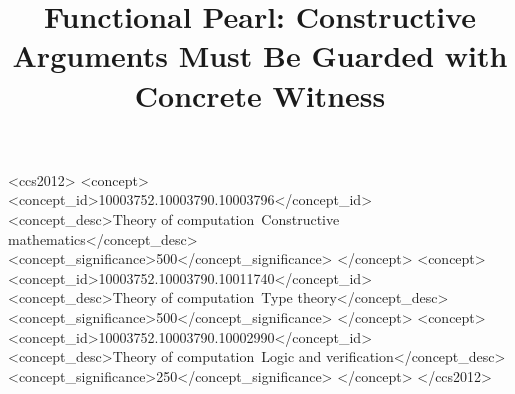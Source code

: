 \documentclass[acmsmall]{acmart}
\begin{document}
\title[Functional Pearl: Constructive Arguments]{Functional Pearl: Constructive Arguments Must Be Guarded with Concrete Witness}



\begin{abstract}
  
\end{abstract}

\begin{CCSXML}
<ccs2012>
   <concept>
       <concept_id>10003752.10003790.10003796</concept_id>
       <concept_desc>Theory of computation~Constructive mathematics</concept_desc>
       <concept_significance>500</concept_significance>
       </concept>
   <concept>
       <concept_id>10003752.10003790.10011740</concept_id>
       <concept_desc>Theory of computation~Type theory</concept_desc>
       <concept_significance>500</concept_significance>
       </concept>
   <concept>
       <concept_id>10003752.10003790.10002990</concept_id>
       <concept_desc>Theory of computation~Logic and verification</concept_desc>
       <concept_significance>250</concept_significance>
       </concept>
 </ccs2012>
\end{CCSXML}




\maketitle
\end{document}
